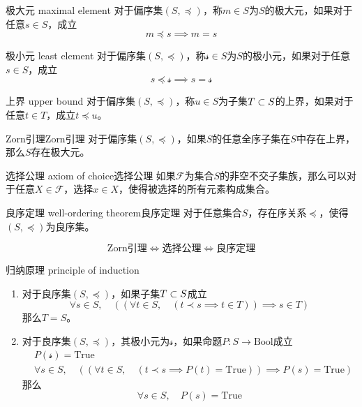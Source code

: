 \begin{definition}{极大元 maximal element}
	对于偏序集$(S,\preceq)$，称$m\in S$为$S$的极大元，如果对于任意$s\in S$，成立
	$$
	m\preceq s\implies m=s
	$$
\end{definition}

\begin{definition}{极小元 least element}
	对于偏序集$(S,\preceq)$，称$\mathcal{s}\in S$为$S$的极小元，如果对于任意$s\in S$，成立
	$$
	s\preceq \mathcal{s}\implies s=\mathcal{s}
	$$
\end{definition}

\begin{definition}{上界 upper bound}
	对于偏序集$(S,\preceq)$，称$u\in S$为子集$T\subset S$的上界，如果对于任意$t\in T$，成立$t\preceq u$。
\end{definition}

\begin{theorem}{Zorn引理}{Zorn引理}
	对于偏序集$(S,\preceq)$，如果$S$的任意全序子集在$S$中存在上界，那么$S$存在极大元。
\end{theorem}

\begin{theorem}{选择公理 axiom of choice}{选择公理}
	如果$\mathscr{F}$为集合$S$的非空不交子集族，那么可以对于任意$X\in \mathscr{F}$，选择$x\in X$，使得被选择的所有元素构成集合。
\end{theorem}

\begin{theorem}{良序定理 well-ordering theorem}{良序定理}
	对于任意集合$S$，存在序关系$\preceq$，使得$(S,\preceq)$为良序集。
\end{theorem}

\begin{theorem}
	$$
	\text{Zorn引理}
	\iff
	\text{选择公理}
	\iff
	\text{良序定理}
	$$
\end{theorem}

\begin{theorem}{归纳原理 principle of induction}
	\begin{enumerate}
		\item 对于良序集$(S,\preceq)$，如果子集$T\subset S$成立
		$$
		\forall s\in S,\quad ((\forall t\in S,\quad (t\prec s\implies t\in T))\implies s\in T)
		$$
		那么$T=S$。
		\item 对于良序集$(S,\preceq)$，其极小元为$\mathcal{s}$，如果命题$P:S\to \text{Bool}$成立
		\begin{align*}
			& P(\mathcal{s})=\text{True}\\
			& \forall s\in S,\quad ((\forall t\in S,\quad (t\prec s\implies P(t)=\text{True}))\implies P(s)=\text{True})
		\end{align*}
		那么
		$$
		\forall s\in S,\quad P(s)=\text{True}
		$$
	\end{enumerate}
\end{theorem}

